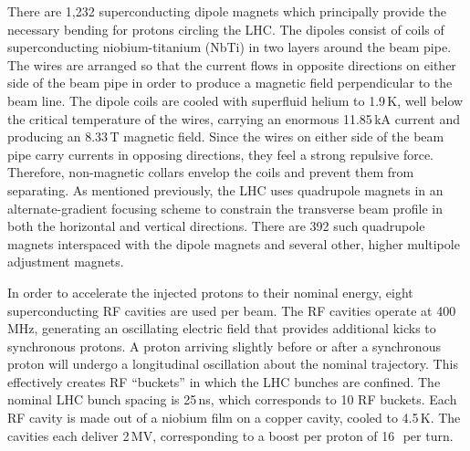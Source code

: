 There are 1,232 superconducting dipole magnets which principally provide the necessary bending for protons circling the LHC. The dipoles consist of coils of superconducting niobium-titanium (NbTi) in two layers around the beam pipe. The wires are arranged so that the current flows in opposite directions on either side of the beam pipe in order to produce a magnetic field perpendicular to the beam line.
The dipole coils are cooled with superfluid helium to 1.9\,K, well below the critical temperature of the wires, carrying an enormous 11.85\,kA current and producing an 8.33\,T magnetic field. Since the wires on either side of the beam pipe carry currents in opposing directions, they feel a strong repulsive force. Therefore, non-magnetic collars envelop the coils and prevent them from separating. As mentioned previously, the LHC uses quadrupole magnets in an alternate-gradient focusing scheme to constrain the transverse beam profile in both the horizontal and vertical directions.
There are 392 such quadrupole magnets interspaced with the dipole magnets and several other, higher multipole adjustment magnets. 

In order to accelerate the injected protons to their nominal energy, eight superconducting RF cavities are used per beam. The RF cavities operate at 400\,MHz, generating an oscillating electric field that provides additional kicks to synchronous protons. A proton arriving slightly before or after a synchronous proton will undergo a longitudinal oscillation about the nominal trajectory. This effectively creates RF ``buckets'' in which the LHC bunches are confined. The nominal LHC bunch spacing is 25\,ns, which corresponds to 10 RF buckets. Each RF cavity is made out of a niobium film on a copper cavity, cooled to 4.5\,K. The cavities each deliver 2\,MV, corresponding to a boost per proton of 16\,\MeV\, per turn. 

